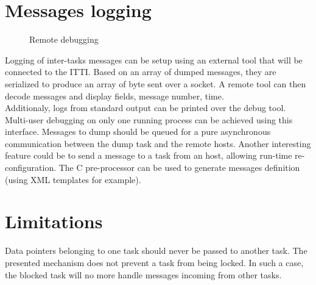 \documentclass[a4paper,oneside]{report}
\begin{document}
\section{Messages logging}
\begin{figure}[H]
    \begin{center}
    \caption{Remote debugging} \label{fig:Remote debugging}
    \end{center}
\end{figure}
Logging of inter-tasks messages can be setup using an external tool that will be
connected to the ITTI. Based on an array of dumped messages, they are serialized
to produce an array of byte sent over a socket. A remote tool can then decode
messages and display fields, message number, time.\\
Additionaly, logs from standard output can be printed over the debug tool.
Multi-user debugging on only one running process can be achieved using this interface.
Messages to dump should be queued for a pure asynchronous communication between the
dump task and the remote hosts.
Another interesting feature could be to send a message to a task from an host,
allowing run-time re-configuration.
The C pre-processor can be used to generate messages definition (using
XML templates
for example).\\
\section{Limitations}
Data pointers belonging to one task should never be passed to another task.
The presented mechanism does not prevent a task from being locked. In such a case,
the blocked task will no more handle messages incoming from other tasks.
\end{document}
